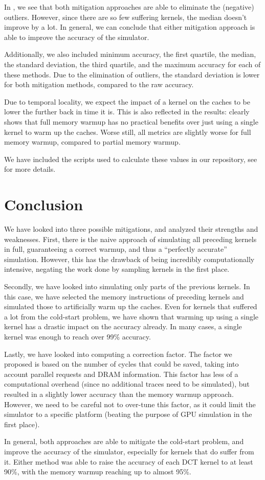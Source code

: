 In , we see that both mitigation approaches are able to eliminate the (negative) outliers.
However, since there are so few suffering kernels, the median doesn't improve by a lot.
In general, we can conclude that either mitigation approach is able to improve the accuracy of the simulator.

Additionally, we also included minimum accuracy, the first quartile, the median, the standard deviation, the third quartile, and the maximum accuracy for each of these methods.
Due to the elimination of outliers, the standard deviation is lower for both mitigation methods, compared to the raw accuracy.

Due to temporal locality, we expect the impact of a kernel on the caches to be lower the further back in time it is.
This is also reflected in the results:  clearly shows that full memory warmup has no practical benefits over just using a single kernel to warm up the caches.
Worse still, all metrics are slightly worse for full memory warmup, compared to partial memory warmup.

We have included the scripts used to calculate these values in our repository, see  for more details.

\FloatBarrier
\section{Conclusion}\label{sec:mitigation-conclusion}

We have looked into three possible mitigations, and analyzed their strengths and weaknesses.
First, there is the naive approach of simulating all preceding kernels in full, guaranteeing a correct warmup, and thus a ``perfectly accurate'' simulation.
However, this has the drawback of being incredibly computationally intensive, negating the work done by sampling kernels in the first place.

Secondly, we have looked into simulating only parts of the previous kernels.
In this case, we have selected the memory instructions of preceding kernels and simulated those to artificially warm up the caches.
Even for kernels that suffered a lot from the cold-start problem, we have shown that warming up using a single kernel has a drastic impact on the accuracy already.
In many cases, a single kernel was enough to reach over 99\% accuracy.

Lastly, we have looked into computing a correction factor.
The factor we proposed is based on the number of cycles that could be saved, taking into account parallel requests and DRAM information.
This factor has less of a computational overhead (since no additional traces need to be simulated), but resulted in a slightly lower accuracy than the memory warmup approach.
However, we need to be careful not to over-tune this factor, as it could limit the simulator to a specific platform (beating the purpose of GPU simulation in the first place).

In general, both approaches are able to mitigate the cold-start problem, and improve the accuracy of the simulator, especially for kernels that do suffer from it.
Either method was able to raise the accuracy of each DCT kernel to at least 90\%, with the memory warmup reaching up to almost 95\%.